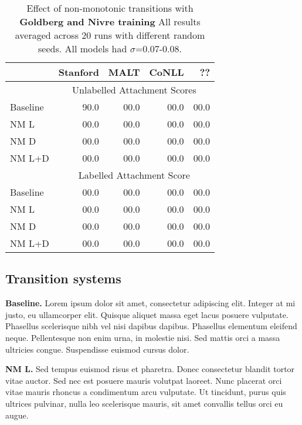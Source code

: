 \documentclass[11pt,letterpaper]{article}
\begin{document}
\begin{table}[t]
    \small
    \centering
    \begin{tabular}{l|rrrr}
        \hline
                              & Stanford & MALT & CoNLL & ?? \\
        \hline \hline
                              & \multicolumn{4}{c}{Unlabelled Attachment Scores} \\
        \hline
        Baseline              &  90.0  & 00.0 & 00.0 & 00.0   \\
        NM L                  &  00.0  & 00.0 & 00.0 & 00.0   \\
        NM D                  &  00.0  & 00.0 & 00.0 & 00.0   \\
        NM L+D                &  00.0  & 00.0 & 00.0 & 00.0    \\ 
        \hline
                              & \multicolumn{4}{c}{Labelled Attachment Score} \\
        \hline
        Baseline              &  00.0  & 00.0 & 00.0  & 00.0   \\
        NM L                  &  00.0  & 00.0 & 00.0  & 00.0   \\
        NM D                  &  00.0  & 00.0 & 00.0  & 00.0   \\
        NM L+D                &  00.0  & 00.0 & 00.0  & 00.0   \\ 
        \hline
    \end{tabular}
    \caption{\small Effect of non-monotonic transitions with \textbf{Goldberg and Nivre training}
            All results averaged across 20 runs with different random seeds. All models
             had $\sigma$=0.07-0.08.\label{tab:goldberg}}
\end{table}

\subsection{Transition systems}

\textbf{Baseline.} Lorem ipsum dolor sit amet, consectetur adipiscing elit. Integer at mi justo, eu ullamcorper elit. Quisque aliquet massa eget lacus posuere vulputate. Phasellus scelerisque nibh vel nisi dapibus dapibus. Phasellus elementum eleifend neque. Pellentesque non enim urna, in molestie nisi. Sed mattis orci a massa ultricies congue. Suspendisse euismod cursus dolor.

\textbf{NM L.} Sed tempus euismod risus et pharetra. Donec consectetur blandit tortor vitae auctor. Sed nec est posuere mauris volutpat laoreet. Nunc placerat orci vitae mauris rhoncus a condimentum arcu vulputate. Ut tincidunt, purus quis ultrices pulvinar, nulla leo scelerisque mauris, sit amet convallis tellus orci eu augue.
\end{document}
